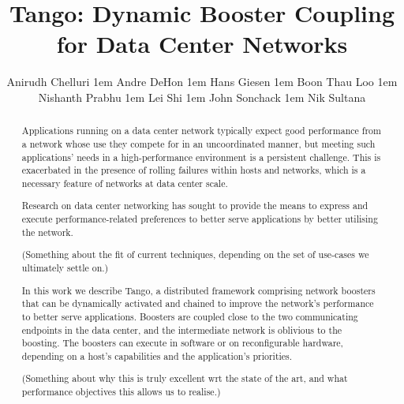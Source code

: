 \documentclass[sigconf]{acmart}
\begin{document}
\title{Tango: Dynamic Booster Coupling for Data Center Networks}

\author{Anirudh Chelluri \kern1em
 Andre DeHon \kern1em
 Hans Giesen \kern1em
 Boon Thau Loo \kern1em
 Nishanth Prabhu \kern1em
 Lei Shi \kern1em
 John Sonchack \kern1em
 Nik Sultana}

%
%
%
%


\renewcommand{\shortauthors}{A. Chelluri et al.}


\begin{abstract}
Applications running on a data center network typically expect good performance
from a network whose use they compete for in an uncoordinated manner, but
meeting such applications' needs in a high-performance environment is a
persistent challenge. This is exacerbated in the presence of rolling failures
within hosts and networks, which is a necessary feature of networks at data
center scale.

Research on data center networking has sought to provide the means to
express and execute performance-related preferences to better serve
applications by better utilising the network.

(Something about the fit of current techniques, depending on the set of use-cases we ultimately settle on.)

In this work we describe Tango, a distributed framework comprising network
boosters that can be dynamically activated and chained to improve the network's
performance to better serve applications. Boosters are coupled close to the two
communicating endpoints in the data center, and the intermediate network is
oblivious to the boosting. The boosters can execute in software or on
reconfigurable hardware, depending on a host's capabilities and the
application's priorities.

(Something about why this is truly excellent wrt the state of the art, and what performance objectives this allows us to realise.)
\end{abstract}
\end{document}
